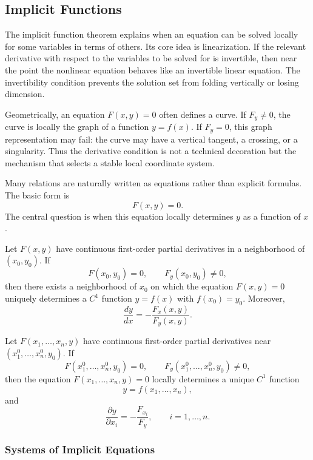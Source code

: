 \subsection{Implicit Functions}


The implicit function theorem explains when an equation can be solved locally for some variables in terms of others. Its core idea is linearization. If the relevant derivative with respect to the variables to be solved for is invertible, then near the point the nonlinear equation behaves like an invertible linear equation. The invertibility condition prevents the solution set from folding vertically or losing dimension.

Geometrically, an equation $F(x,y)=0$ often defines a curve. If $F_y\neq 0$, the curve is locally the graph of a function $y=f(x)$. If $F_y=0$, this graph representation may fail: the curve may have a vertical tangent, a crossing, or a singularity. Thus the derivative condition is not a technical decoration but the mechanism that selects a stable local coordinate system.

Many relations are naturally written as equations rather than explicit formulas. The basic form is
\[
    F(x,y)=0.
\]
The central question is when this equation locally determines $y$ as a function of $x$.

\begin{theorem}
Let $F(x,y)$ have continuous first-order partial derivatives in a neighborhood of $(x_0,y_0)$. If
\[
    F(x_0,y_0)=0,
    \qquad F_y(x_0,y_0)\ne0,
\]
then there exists a neighborhood of $x_0$ on which the equation $F(x,y)=0$ uniquely determines a $C^1$ function $y=f(x)$ with $f(x_0)=y_0$. Moreover,
\[
    \frac{dy}{dx}=-\frac{F_x(x,y)}{F_y(x,y)}.
\]
\end{theorem}

\begin{theorem}
Let $F(x_1,\dots,x_n,y)$ have continuous first-order partial derivatives near $(x_1^0,\dots,x_n^0,y_0)$. If
\[
    F(x_1^0,\dots,x_n^0,y_0)=0,
    \qquad F_y(x_1^0,\dots,x_n^0,y_0)\ne0,
\]
then the equation $F(x_1,\dots,x_n,y)=0$ locally determines a unique $C^1$ function
\[
    y=f(x_1,\dots,x_n),
\]
and
\[
    \frac{\partial y}{\partial x_i}=-\frac{F_{x_i}}{F_y},\qquad i=1,\dots,n.
\]
\end{theorem}

\subsubsection{Systems of Implicit Equations}

